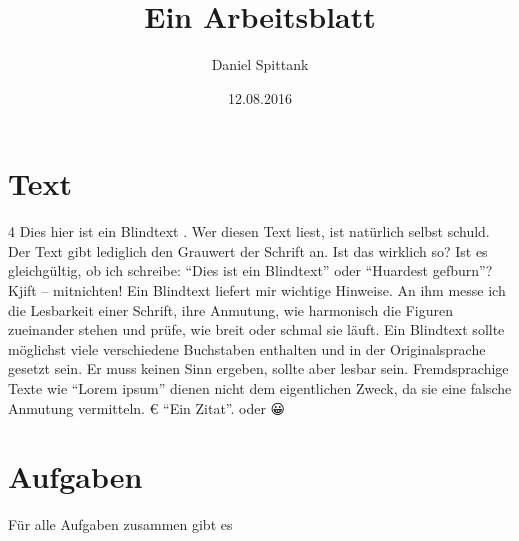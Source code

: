 \documentclass[a4paper]{scrartcl}
\title{Ein Arbeitsblatt}
\author{Daniel Spittank}
\date{12.08.2016}
\begin{document}
\section*{Text}
\begin{zeilenNrMehrspaltig}{4}
    Dies hier ist ein Blindtext . Wer diesen Text liest, ist natürlich
    selbst schuld. Der Text gibt lediglich den Grauwert der Schrift an. Ist das wirklich so?
    Ist es gleichgültig, ob ich schreibe: \enquote{Dies ist ein Blindtext} oder \enquote{Huardest gefburn}?
    Kjift – mitnichten! Ein Blindtext liefert mir wichtige Hinweise. An ihm messe ich
    die Lesbarkeit einer Schrift, ihre Anmutung, wie harmonisch die Figuren zueinander
    stehen und prüfe, wie breit oder schmal sie läuft. Ein Blindtext sollte möglichst viele
    verschiedene Buchstaben enthalten und in der Originalsprache gesetzt sein. Er muss
    keinen Sinn ergeben, sollte aber lesbar sein. Fremdsprachige Texte wie \enquote{Lorem ipsum}
    dienen nicht dem eigentlichen Zweck, da sie eine falsche Anmutung vermitteln. € \enquote{Ein Zitat}.  \SuS oder \KuK 😀 \symUhr
\end{zeilenNrMehrspaltig}

\section*{Aufgaben}Für alle Aufgaben zusammen gibt es \printtotalpoints
\end{document}
